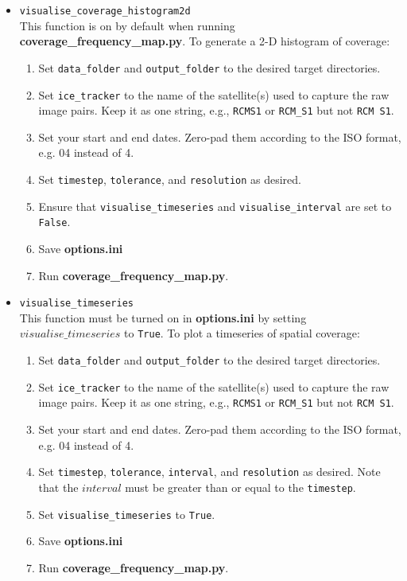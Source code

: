 \documentclass{article}
\begin{document}
        \begin{itemize}
            \item{} \verb?visualise_coverage_histogram2d? \\
            This function is on by default when running \textbf{coverage\_frequency\_map.py}. To generate a 2-D histogram of coverage:
            \begin{enumerate}
                \item Set \verb?data_folder? and \verb?output_folder? to the desired target directories.
                \item Set \verb?ice_tracker? to the name of the satellite(s) used to capture the raw image pairs. Keep it as one string, e.g.,  \verb?RCMS1? or \verb?RCM_S1? but not \verb?RCM S1?.
                \item Set your start and end dates. Zero-pad them according to the ISO format, e.g. 04 instead of 4.
                \item Set \verb?timestep?, \verb?tolerance?, and \verb?resolution? as desired.
                \item Ensure that \verb?visualise_timeseries? and \verb?visualise_interval? are set to \verb?False?.
                \item Save \textbf{options.ini}
                \item Run \textbf{coverage\_frequency\_map.py}.
            \end{enumerate}

            \item{} \verb?visualise_timeseries? \\
            This function must be turned on in \textbf{options.ini} by setting $visualise\_timeseries$ to \verb?True?. To plot a timeseries of spatial coverage:
            \begin{enumerate}
                \item Set \verb?data_folder? and \verb?output_folder? to the desired target directories.
                \item Set \verb?ice_tracker? to the name of the satellite(s) used to capture the raw image pairs. Keep it as one string, e.g.,  \verb?RCMS1? or \verb?RCM_S1? but not \verb?RCM S1?.
                \item Set your start and end dates. Zero-pad them according to the ISO format, e.g. 04 instead of 4.
                \item Set \verb?timestep?, \verb?tolerance?, \verb?interval?, and \verb?resolution? as desired. Note that the $interval$ must be greater than or equal to the \verb?timestep?.
                \item Set \verb?visualise_timeseries? to \verb?True?.
                \item Save \textbf{options.ini}
                \item Run \textbf{coverage\_frequency\_map.py}.
            \end{enumerate}


\end{itemize}
\end{document}
